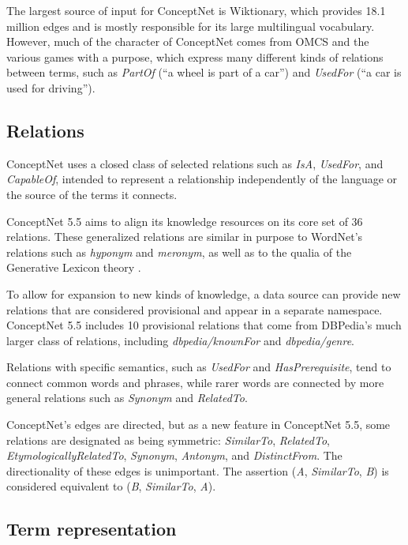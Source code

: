 \documentclass[letterpaper]{article}
\begin{document}
The largest source of input for ConceptNet is Wiktionary, which provides
18.1 million edges and is mostly responsible for its large multilingual
vocabulary. However, much of the character of ConceptNet comes from OMCS
and the various games with a purpose, which express many different kinds
of relations between terms, such as \emph{PartOf} (``a wheel is part of
a car'') and \emph{UsedFor} (``a car is used for driving'').


\subsection{Relations}\label{relations}

ConceptNet uses a closed class of selected relations such as \emph{IsA},
\emph{UsedFor}, and \emph{CapableOf}, intended to
represent a relationship independently of the language or the source of
the terms it connects.

ConceptNet 5.5 aims to align its knowledge resources on its core set of 36
relations. These generalized relations are similar in purpose to WordNet's
relations such as \emph{hyponym} and \emph{meronym}, as well as to the qualia
of the Generative Lexicon theory \cite{pustejovsky1991generative}.

To allow for expansion to new kinds of knowledge, a data
source can provide new relations that are considered provisional and
appear in a separate namespace. ConceptNet 5.5 includes 10 provisional
relations that come from DBPedia's much larger class of relations,
including \emph{dbpedia/knownFor} and \emph{dbpedia/genre}.

Relations with specific semantics, such as \emph{UsedFor} and
\emph{HasPrerequisite}, tend to connect common words and phrases, while
rarer words are connected by more general relations such as
\emph{Synonym} and \emph{RelatedTo}.

ConceptNet's edges are directed, but as a new feature in ConceptNet 5.5,
some relations are designated as being symmetric: \emph{SimilarTo},
\emph{RelatedTo}, \emph{EtymologicallyRelatedTo}, \emph{Synonym},
\emph{Antonym}, and \emph{DistinctFrom}. The directionality of these
edges is unimportant. The assertion (\emph{A}, \emph{SimilarTo},
\emph{B}) is considered equivalent to (\emph{B}, \emph{SimilarTo},
\emph{A}).


\subsection{Term representation}\label{term-representation}
\end{document}
